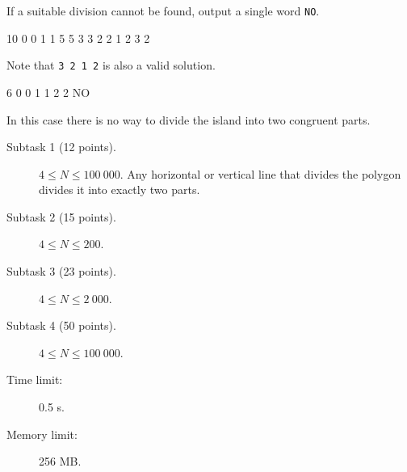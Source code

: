 \documentclass{boi2014}
\newcommand{\constant}[1]{{\tt #1}}
\begin{document}
	If a suitable division cannot be found, output a single word
	\constant{NO}.

    \clearpage

    \Examples
	\example
	{
		10  0  0  1  1  5  5  3  3  2  2
	}
	{
		1 2 3 2
	}
	{
        Note that {\tt 3 2 1 2} is also a valid solution.

        \begin{center}
        \end{center}
    }

    \example
    {
        6  0  0  1  1  2  2
    }
    {
        NO
    }
    {
        In this case there is no way to divide the island into two congruent
        parts.
        \begin{center}
        \end{center}
    }

    \Scoring

    \begin{description}
        \item[Subtask 1 (12 points).] $4 \le N \le 100\ 000$.
        Any horizontal or vertical line that divides the polygon divides it into
        exactly two parts.
        
        \item[Subtask 2 (15 points).] $4 \le N \le 200$.
        \item[Subtask 3 (23 points).] $4 \le N \le 2\ 000$.
        \item[Subtask 4 (50 points).] $4 \le N \le 100\ 000$.
    \end{description}

    \Constraints

    \begin{description}
        \item[Time limit:] 0.5 s.
        \item[Memory limit:] 256 MB.
    \end{description}
\end{document}
